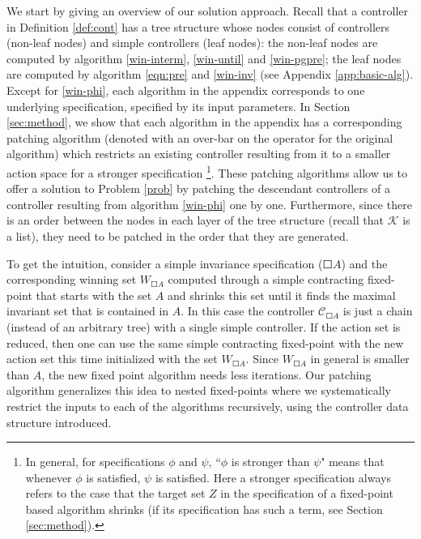 We start by giving an overview of our solution approach. Recall that a controller in Definition \ref{def:cont} has a tree structure whose nodes consist of controllers (non-leaf nodes) and simple controllers (leaf nodes): the non-leaf nodes are computed by algorithm \eqref{win-interm}, \eqref{win-until} and \eqref{win-pgpre}; the leaf nodes are computed by algorithm \eqref{eqn:pre} and \eqref{win-inv} (see Appendix \ref{app:basic-alg}). Except for \eqref{win-phi}, each algorithm in the appendix corresponds to one underlying specification, specified by its input parameters. In Section \ref{sec:method}, we show that each algorithm in the appendix has a corresponding patching algorithm (denoted with an over-bar on the operator for the original algorithm) which restricts an existing controller resulting from it to a smaller action space for a stronger specification \footnote{In general, for specifications $ \phi $ and $ \psi $, ``$ \phi $ is stronger than $ \psi $"  means that whenever $ \phi $ is satisfied, $ \psi $ is satisfied. Here a stronger specification always refers to the case that the target set $ Z $ in the specification of a fixed-point based algorithm shrinks (if its specification has such a term, see Section \ref{sec:method}).}. These patching algorithms allow us to offer a solution to Problem \ref{prob} by patching the {\color{teal}descendant} controllers of a controller resulting from algorithm \eqref{win-phi} one by one. Furthermore, since there is an order between the nodes in each layer of the tree structure (recall that $ \mathcal{K} $ is a list), they need to be patched in the order that they are generated. 

To get the intuition, consider a simple invariance specification ($\Square A$) and the corresponding winning set $W_{\Square A}$ computed through a simple contracting fixed-point that starts with the set $A$ and shrinks this set until it finds the maximal invariant set that is contained in $A$. In this case the controller $\mathcal{C}_{\Square A}$ is just a chain (instead of an arbitrary tree) with a single simple controller. If the action set is reduced, then one can use the same simple contracting fixed-point with the new action set this time initialized with the set $W_{\Square A}$. Since $W_{\Square A}$ in general is smaller than $A$, the new fixed point algorithm needs less iterations. Our patching algorithm generalizes this idea to nested fixed-points where we systematically  restrict the inputs to each of the algorithms recursively, using the controller data structure introduced.  

